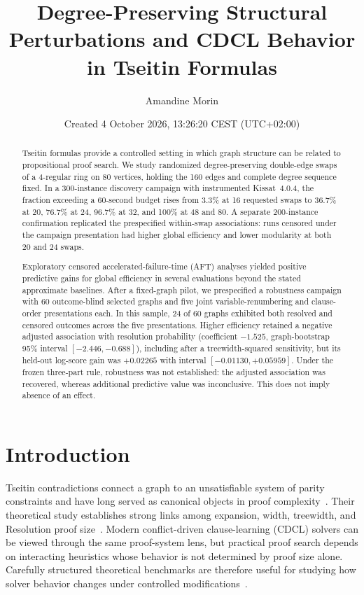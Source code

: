 \documentclass[11pt]{article}
\title{Degree-Preserving Structural Perturbations and CDCL Behavior in Tseitin Formulas}
\author{Amandine Morin}
\date{Created 4 October 2026, 13:26:20 CEST (UTC+02:00)}
\begin{document}
\maketitle

\begin{abstract}
Tseitin formulas provide a controlled setting in which graph structure can be related to propositional proof search. We study randomized degree-preserving double-edge swaps of a 4-regular ring on 80 vertices, holding the 160 edges and complete degree sequence fixed. In a 300-instance discovery campaign with instrumented Kissat~4.0.4, the fraction exceeding a 60-second budget rises from 3.3\% at 16 requested swaps to 36.7\% at 20, 76.7\% at 24, 96.7\% at 32, and 100\% at 48 and 80. A separate 200-instance confirmation replicated the prespecified within-swap associations: runs censored under the campaign presentation had higher global efficiency and lower modularity at both 20 and 24 swaps.

Exploratory censored accelerated-failure-time (AFT) analyses yielded positive predictive gains for global efficiency in several evaluations beyond the stated approximate baselines. After a fixed-graph pilot, we prespecified a robustness campaign with 60 outcome-blind selected graphs and five joint variable-renumbering and clause-order presentations each. In this sample, 24 of 60 graphs exhibited both resolved and censored outcomes across the five presentations. Higher efficiency retained a negative adjusted association with resolution probability (coefficient $-1.525$, graph-bootstrap 95\% interval $[-2.446,-0.688]$), including after a treewidth-squared sensitivity, but its held-out log-score gain was $+0.02265$ with interval $[-0.01130,+0.05959]$. Under the frozen three-part rule, robustness was not established: the adjusted association was recovered, whereas additional predictive value was inconclusive. This does not imply absence of an effect.
\end{abstract}

\section{Introduction}

Tseitin contradictions connect a graph to an unsatisfiable system of parity constraints and have long served as canonical objects in proof complexity~\cite{Tseitin1970,BenSassonWigderson2001}. Their theoretical study establishes strong links among expansion, width, treewidth, and Resolution proof size~\cite{AlekhnovichRazborov2011,ItsyksonEtAl2022,deColnetMengel2023}. Modern conflict-driven clause-learning (CDCL) solvers can be viewed through the same proof-system lens, but practical proof search depends on interacting heuristics whose behavior is not determined by proof size alone. Carefully structured theoretical benchmarks are therefore useful for studying how solver behavior changes under controlled modifications~\cite{ElffersEtAl2018}.
\end{document}
